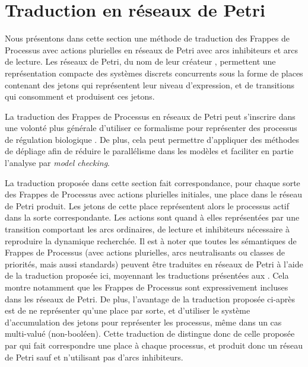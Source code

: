 
\section{Traduction en réseaux de Petri}

Nous présentons dans cette section une méthode de traduction des Frappes de Processus
avec actions plurielles en réseaux de Petri avec arcs inhibiteurs et arcs de lecture.
Les réseaux de Petri, du nom de leur créateur ,
permettent une représentation compacte des systèmes discrets concurrents
sous la forme de places contenant des jetons qui représentent leur niveau d'expression,
et de transitions qui consomment et produisent ces jetons.

La traduction des Frappes de Processus en réseaux de Petri peut s'inscrire dans une volonté
plus générale d'utiliser ce formalisme pour représenter des processus de régulation
biologique \cite{Chaouiya07petrinet}.
De plus, cela peut permettre d'appliquer des méthodes de dépliage \cite{baldan00}
afin de réduire le parallélisme dans les modèles et faciliter en partie l'analyse
par \textit{model checking}.

La traduction proposée dans cette section fait correspondance, pour chaque sorte
des Frappes de Processus avec actions plurielles initiales, une place dans le réseau de Petri
produit.
Les jetons de cette place représentent alors le processus actif dans la sorte correspondante.
Les actions sont quand à elles représentées par une transition comportant les arcs ordinaires,
de lecture et inhibiteurs nécessaire à reproduire la dynamique recherchée.
Il est à noter que toutes les sémantiques de Frappes de Processus
(avec actions plurielles, arcs neutralisants ou classes de priorités,
mais aussi standards)
peuvent être traduites en réseaux de Petri à l'aide de la traduction proposée ici,
moyennant les traductions présentées aux .
Cela montre notamment que les Frappes de Processus sont expressivement incluses
dans les réseaux de Petri.
De plus, l'avantage de la traduction proposée ci-après est de ne représenter qu'une place
par sorte,
et d'utiliser le système d'accumulation des jetons pour représenter les processus,
même dans un cas multi-valué (non-booléen).
Cette traduction de distingue donc de celle proposée par 
qui fait correspondre une place à chaque processus,
et produit donc un réseau de Petri sauf et n'utilisant pas d'arcs inhibiteurs.

